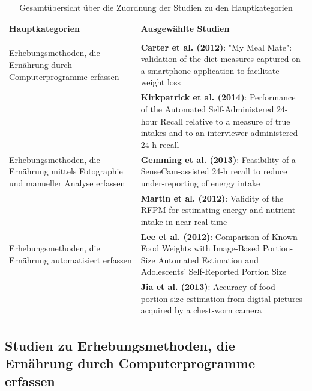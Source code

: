

\begin{table}[!h]
\begin{flushleft}
\caption{Gesamtübersicht über die Zuordnung der Studien zu den Hauptkategorien}
\end{flushleft}
\begin{tabular}{p{6cm} p{8cm}}
Hauptkategorien & Ausgewählte Studien \\
\hline\\

Erhebungsmethoden, die Ernährung durch Computerprogramme erfassen &
\textbf{Carter et al. (2012)}: "My Meal Mate": validation of the diet measures captured on a smartphone application to facilitate weight loss \\
&
\textbf{Kirkpatrick et al. (2014)}: Performance of the Automated Self-Administered 24-hour Recall relative to a measure of true intakes and to an interviewer-administered 24-h recall \\

Erhebungsmethoden, die Ernährung mittels Fotographie und manueller Analyse erfassen &
\textbf{Gemming et al. (2013)}: Feasibility of a SenseCam-assisted 24-h recall to reduce under-reporting of energy intake \\
&
\textbf{Martin et al. (2012)}: Validity of the RFPM for estimating energy and nutrient intake in near real-time \\

Erhebungsmethoden, die Ernährung automatisiert erfassen &
\textbf{Lee et al. (2012)}: Comparison of Known Food Weights with Image-Based Portion-Size Automated Estimation and Adolescents’ Self-Reported Portion Size \\
&
\textbf{Jia et al. (2013)}: Accuracy of food portion size estimation from digital pictures acquired by a chest-worn camera 


\end{tabular}
\end{table}
\newpage


\subsection{Studien zu Erhebungsmethoden, die Ernährung durch Computerprogramme erfassen}

